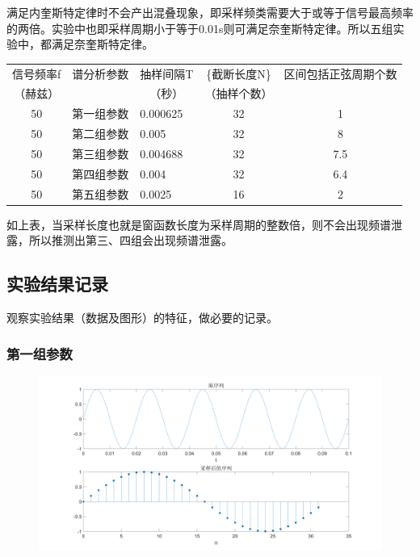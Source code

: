 \documentclass{../source/Experiment copy}
\begin{document}
            满足内奎斯特定律时不会产出混叠现象，即采样频类需要大于或等于信号最高频率的两倍。实验中也即采样周期小于等于0.01s则可满足奈奎斯特定律。所以五组实验中，都满足奈奎斯特定律。
            \begin{table}[H]
                \centering
                \begin{tabular}{|c|c|l|c|c|}
                \hline
                信号频率f & 谱分析参数 & \multicolumn{1}{c|}{抽样间隔T} & \{截断长度N\} & 区间包括正弦周期个数 \\
                （赫兹）  &       & \multicolumn{1}{c|}{（秒）}   & （抽样个数）    &            \\ \hline
                50    & 第一组参数 & 0.000625                   & 32        & 1          \\ \hline
                50    & 第二组参数 & 0.005                      & 32        & 8          \\ \hline
                50    & 第三组参数 & 0.004688                   & 32        & 7.5        \\ \hline
                50    & 第四组参数 & 0.004                      & 32        & 6.4        \\ \hline
                50    & 第五组参数 & 0.0025                     & 16        & 2          \\ \hline
                \end{tabular}
            \end{table}
            如上表，当采样长度也就是窗函数长度为采样周期的整数倍，则不会出现频谱泄露，所以推测出第三、四组会出现频谱泄露。

        \subsection{实验结果记录}
        观察实验结果（数据及图形）的特征，做必要的记录。
            \subsubsection{第一组参数}
                \begin{figure}[H]
                    \centering
                    \includegraphics[width = \textwidth]{src/exp2_1_1.png}
                \end{figure}
\end{document}

